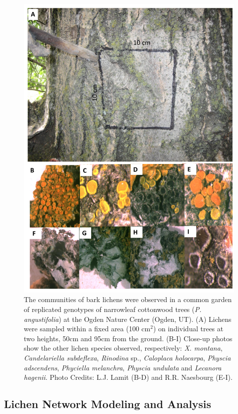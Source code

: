 \documentclass[fleqn,12pt]{olplainarticle}
\begin{document}
\begin{figure}[t]
\centering
\includegraphics[width=\linewidth]{lcn_sampling.png}
\caption{The communities of bark lichens were observed in a common
  garden of replicated genotypes of narrowleaf cottonwood trees
  (\textit{P. angustifolia}) at the Ogden Nature Center (Ogden,
  UT). (A) Lichens were sampled within a fixed area (100 cm$^2$) on
  individual trees at two heights, 50cm and 95cm from the
  ground. (B-I) Close-up photos show the other lichen species
  observed, respectively:  \textit{X. montana}, \textit{Candelariella
    subdeflexa}, \textit{Rinodina} sp., \textit{Caloplaca holocarpa},
  \textit{Physcia adscendens}, \textit{Phyciella melanchra},
  \textit{Physcia undulata} and \textit{Lecanora hagenii}. Photo
  Credits: L.J. Lamit (B-D) and R.R. Naesbourg (E-I).}
\label{fig:lichen_sampling}
\end{figure}


\subsection*{Lichen Network Modeling and Analysis}
\end{document}
